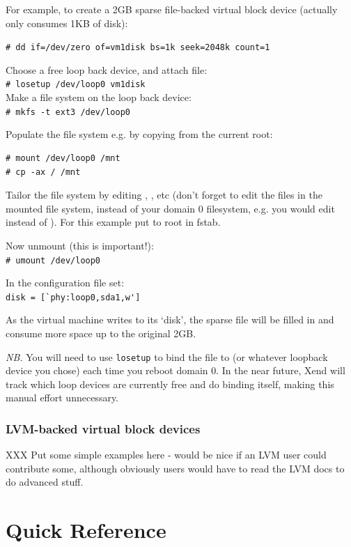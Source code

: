 \documentclass[11pt,twoside,final,openright]{xenstyle}
\begin{document}
For example, to create a 2GB sparse file-backed virtual block device
(actually only consumes 1KB of disk):

\verb_# dd if=/dev/zero of=vm1disk bs=1k seek=2048k count=1_

Choose a free loop back device, and attach file: \\
\verb_# losetup /dev/loop0 vm1disk_ \\
Make a file system on the loop back device: \\
\verb_# mkfs -t ext3 /dev/loop0_

Populate the file system e.g. by copying from the current root:
\begin{verbatim}
# mount /dev/loop0 /mnt
# cp -ax / /mnt
\end{verbatim}
Tailor the file system by editing ,
, etc (don't forget to edit the files in the
mounted file system, instead of your domain 0 filesystem, e.g. you
would edit  instead of  ).  For
this example put  to root in fstab.

Now unmount (this is important!):\\
\verb_# umount /dev/loop0_

In the configuration file set:\\
\verb_disk = [`phy:loop0,sda1,w']_

As the virtual machine writes to its `disk', the sparse file will be
filled in and consume more space up to the original 2GB.

{\em NB.} You will need to use {\tt losetup} to bind the file to
 (or whatever loopback device you chose) each time
you reboot domain 0.  In the near future, Xend will track which loop
devices are currently free and do binding itself, making this manual
effort unnecessary.

\section{LVM-backed virtual block devices}

XXX Put some simple examples here - would be nice if an LVM user could
contribute some, although obviously users would have to read the LVM
docs to do advanced stuff.

\part{Quick Reference}
\end{document}

